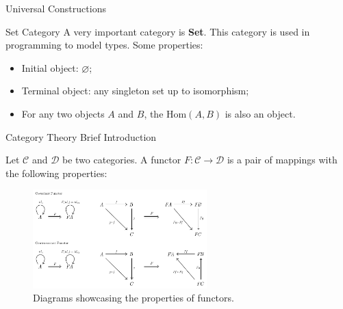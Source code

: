 \documentclass[aspectratio=169,xcolor=dvipsnames,10pt]{beamer}
\theoremstyle{definition}
\begin{document}
\begin{frame}[fragile]{Universal Constructions}
	\begin{definition}[Product]
	\end{definition}
\end{frame}

\begin{frame}[fragile]{Set Category}
    A very important category is \textbf{Set}. This category is used in programming
    to model types. Some properties:
    \begin{itemize}
        \item Initial object: $\varnothing$;
        \item Terminal object: any singleton set up to isomorphism;
        \item For any two objects $A$ and $B$, the $\text{Hom}(A,B)$ is also an object.
    \end{itemize}

\end{frame}

\begin{frame}[fragile]{Category Theory Brief Introduction}
	\begin{definition}[Functor]
		Let $\mathcal C$ and $\mathcal D$ be two categories. A functor $F: \mathcal C \to \mathcal D$ is
		a pair of mappings with the following properties:
		\begin{figure}[H]
			\begin{center}
				\includegraphics[width=0.6\textwidth]{./figs/Functor.pdf}
			\end{center}
			\caption{Diagrams showcasing the properties of functors.}
			\label{fig:Functor}
		\end{figure}
	\end{definition}

\end{frame}
\end{document}
